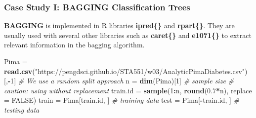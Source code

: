 \documentclass[
]{book}
\newenvironment{Shaded}{\begin{snugshade}}{\end{snugshade}}
\newcommand{\AttributeTok}[1]{\textcolor[rgb]{0.13,0.29,0.53}{#1}}
\newcommand{\CommentTok}[1]{\textcolor[rgb]{0.56,0.35,0.01}{\textit{#1}}}
\newcommand{\ConstantTok}[1]{\textcolor[rgb]{0.56,0.35,0.01}{#1}}
\newcommand{\DecValTok}[1]{\textcolor[rgb]{0.00,0.00,0.81}{#1}}
\newcommand{\FloatTok}[1]{\textcolor[rgb]{0.00,0.00,0.81}{#1}}
\newcommand{\FunctionTok}[1]{\textcolor[rgb]{0.13,0.29,0.53}{\textbf{#1}}}
\newcommand{\NormalTok}[1]{#1}
\newcommand{\OtherTok}[1]{\textcolor[rgb]{0.56,0.35,0.01}{#1}}
\newcommand{\SpecialCharTok}[1]{\textcolor[rgb]{0.81,0.36,0.00}{\textbf{#1}}}
\newcommand{\StringTok}[1]{\textcolor[rgb]{0.31,0.60,0.02}{#1}}
\begin{document}
\hfill\break

\hypertarget{case-study-i-bagging-classification-trees}{%
\subsubsection{Case Study I: BAGGING Classification Trees}\label{case-study-i-bagging-classification-trees}}

\hfill\break

\textbf{BAGGING} is implemented in R libraries \textbf{ipred\{\}} and \textbf{rpart\{\}}. They are usually used with several other libraries such as \textbf{caret\{\}} and \textbf{e1071\{\}} to extract relevant information in the bagging algorithm.

\begin{Shaded}
\begin{Highlighting}[]
\NormalTok{Pima }\OtherTok{=} \FunctionTok{read.csv}\NormalTok{(}\StringTok{"https://pengdsci.github.io/STA551/w03/AnalyticPimaDiabetes.csv"}\NormalTok{)[,}\SpecialCharTok{{-}}\DecValTok{1}\NormalTok{]}
\CommentTok{\# We use a random split approach}
\NormalTok{n }\OtherTok{=} \FunctionTok{dim}\NormalTok{(Pima)[}\DecValTok{1}\NormalTok{]  }\CommentTok{\# sample size}
\CommentTok{\# caution: using without replacement}
\NormalTok{train.id }\OtherTok{=} \FunctionTok{sample}\NormalTok{(}\DecValTok{1}\SpecialCharTok{:}\NormalTok{n, }\FunctionTok{round}\NormalTok{(}\FloatTok{0.7}\SpecialCharTok{*}\NormalTok{n), }\AttributeTok{replace =} \ConstantTok{FALSE}\NormalTok{)  }
\NormalTok{train }\OtherTok{=}\NormalTok{ Pima[train.id, ]    }\CommentTok{\# training data}
\NormalTok{test }\OtherTok{=}\NormalTok{ Pima[}\SpecialCharTok{{-}}\NormalTok{train.id, ]    }\CommentTok{\# testing data}
\end{Highlighting}
\end{Shaded}
\end{document}
